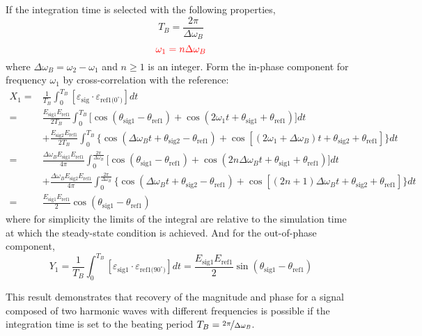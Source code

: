 If the integration time is selected with the following properties,
\[ T_B = \frac{2\pi}{\Delta\omega_B} \]
\[ {\color{red} \omega_1 = n \Delta\omega_B } \]
where $\Delta\omega_B = \omega_2 - \omega_1$ and $n \geq 1$ is an integer.
Form the in-phase component for frequency $\omega_1$ by cross-correlation
with the reference:
\begin{align*}
  X_1 = & \frac{1}{T_B} \int_0^{T_B} [ \varepsilon_\text{sig} \cdot
      \varepsilon_\text{ref1($0^\circ$)} ] dt \\
    = & \frac{E_\text{sig1} E_\text{ref1}}{2 T_B} \int_0^{T_B} \big[
      \cos(\theta_\text{sig1} - \theta_\text{ref1})
      + \cos(2\omega_1 t + \theta_\text{sig1} + \theta_\text{ref1}) \big] dt \\
    & + \frac{E_\text{sig2} E_\text{ref1}}{2 T_B} \int_0^{T_B} \big\{
      \cos(\Delta\omega_B t + \theta_\text{sig2} - \theta_\text{ref1})
      + \cos[(2\omega_1 + \Delta\omega_B) t + \theta_\text{sig2}
      + \theta_\text{ref1}] \big\} dt \\
    = & \frac{\Delta\omega_B E_\text{sig1} E_\text{ref1}}{4\pi}
      \int_0^{\frac{2\pi}{\Delta\omega_B}} \big[ \cos(\theta_\text{sig1}
      - \theta_\text{ref1}) + \cos(2n\Delta\omega_B t + \theta_\text{sig1}
      + \theta_\text{ref1}) \big] dt \\ 
    & + \frac{\Delta\omega_B E_\text{sig2} E_\text{ref1}}{4\pi}
      \int_0^{\frac{2\pi}{\Delta\omega_B}} \big\{ \cos(\Delta\omega_B t
      + \theta_\text{sig2} - \theta_\text{ref1}) + \cos[(2n + 1)\Delta\omega_B t
      + \theta_\text{sig2} + \theta_\text{ref1}] \big\} dt \\
    = & \frac{E_\text{sig1} E_\text{ref1}}{2}
      \cos(\theta_\text{sig1} - \theta_\text{ref1})
\end{align*}
where for simplicity the limits of the integral are relative to
the simulation time at which the steady-state condition is achieved.
And for the out-of-phase component,
\[ Y_1 = \frac{1}{T_B} \int_0^{T_B} [ \varepsilon_\text{sig1} \cdot
  \varepsilon_\text{ref1($90^\circ$)} ] dt
  = \frac{E_\text{sig1} E_\text{ref1}}{2}
  \sin(\theta_\text{sig1} - \theta_\text{ref1}) \]

This result demonstrates that recovery of the magnitude and phase for
a signal composed of two harmonic waves with different frequencies is possible
if the integration time is set to the beating period
$T_B = \nicefrac{2\pi}{\Delta\omega_B}$.

